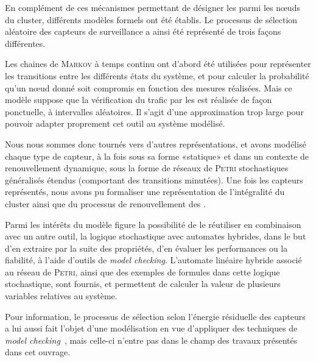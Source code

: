 En complément de ces mécanismes permettant de désigner les \cnst parmi les nœuds du cluster, différents modèles formels ont été établis.
Le processus de sélection aléatoire des capteurs de surveillance a ainsi été représenté de trois façons différentes.

Les chaines de \textsc{Markov} à temps continu ont d'abord été utilisées pour représenter les transitions entre les différents états du système, et pour calculer la probabilité qu'un nœud donné soit compromis en fonction des mesures réalisées.
Mais ce modèle suppose que la vérification du trafic par les \cnst est réalisée de façon ponctuelle, à intervalles aléatoires.
Il s'agit d'une approximation trop large pour pouvoir adapter proprement cet outil au système modélisé.

Nous nous sommes donc tournés vers d'autres représentations, et avons modélisé chaque type de capteur, à la fois sous sa forme «statique» et dans un contexte de renouvellement dynamique, sous la forme de réseaux de \textsc{Petri} stochastiques généralisés étendus (comportant des transitions minutées).
Une fois les capteurs représentés, nous avons pu formaliser une représentation de l'intégralité du cluster ainsi que du processus de renouvellement des \cnst.

Parmi les intérêts du modèle figure la possibilité de le réutiliser en combinaison avec un autre outil, la logique stochastique avec automates hybrides, dans le but d'en extraire par la suite des propriétés, d'en évaluer les performances ou la fiabilité, à l'aide d'outils de \textit{model checking}.
L'automate linéaire hybride associé au réseau de \textsc{Petri}, ainsi que des exemples de formules dans cette logique stochastique, sont fournis, et permettent de calculer la valeur de plusieurs variables relatives au système.

Pour information, le processus de sélection selon l'énergie résiduelle des capteurs a lui aussi fait l'objet d'une modélisation en vue d'appliquer des techniques de \textit{model checking}~\cite{HMMBA14}, mais celle-ci n'entre pas dans le champ des travaux présentés dans cet ouvrage.

